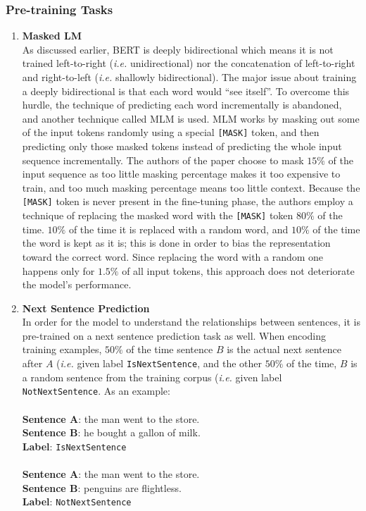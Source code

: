 

\subsubsection{Pre-training Tasks}
\label{bg:s4_sub4_subsub2}

\begin{enumerate}
	\item \textbf{Masked LM} \\
	As discussed earlier, \ac{BERT} is deeply bidirectional which means it is not trained left-to-right (\textit{i.e.} unidirectional) nor the concatenation of left-to-right and right-to-left (\textit{i.e.} shallowly bidirectional). The major issue about training a deeply bidirectional is that each word would \enquote{see itself}. To overcome this hurdle, the technique of predicting each word incrementally is abandoned, and another technique called \ac{MLM} is used. \ac{MLM} works by masking out some of the input tokens randomly using a special \texttt{[MASK]} token, and then predicting only those masked tokens instead of predicting the whole input sequence incrementally. The authors of the paper choose to mask $15\%$ of the input sequence as too little masking percentage makes it too expensive to train, and too much masking percentage means too little context. Because the \texttt{[MASK]} token is never present in the fine-tuning phase, the authors employ a technique of replacing the masked word with the \texttt{[MASK]} token $80\%$ of the time. $10\%$ of the time it is replaced with a random word, and $10\%$ of the time the word is kept as it is; this is done in order to bias the representation toward the correct word. Since replacing the word with a random one happens only for $1.5\%$ of all input tokens, this approach does not deteriorate the model's performance.
	\item \textbf{Next Sentence Prediction} \\
	In order for the model to understand the relationships between sentences, it is pre-trained on a next sentence prediction task as well. When encoding training examples, $50\%$ of the time sentence $B$ is the actual next sentence after $A$ (\textit{i.e.} given label \texttt{IsNextSentence}, and the other $50\%$ of the time, $B$ is a random sentence from the training corpus  (\textit{i.e.} given label \texttt{NotNextSentence}.
	As an example: \\ \\
	\textbf{Sentence A}: the man went to the store. \\
	\textbf{Sentence B}: he bought a gallon of milk. \\
	\textbf{Label}: \texttt{IsNextSentence} \\ \\
	\textbf{Sentence A}: the man went to the store. \\
	\textbf{Sentence B}: penguins are flightless. \\
	\textbf{Label}: \texttt{NotNextSentence}
	
\end{enumerate}


